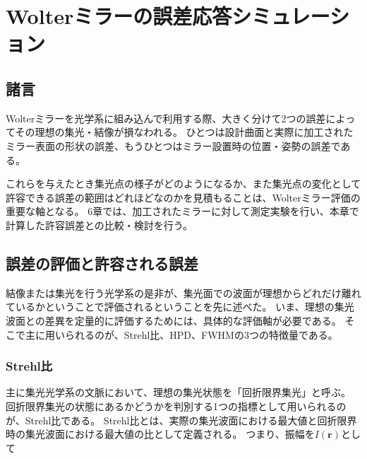 \chapter{Wolterミラーの誤差応答シミュレーション}
\thispagestyle{empty}
\label{chap2}
\graphicspath{{chap2/figure/}}
\minitoc

\newpage


\section{諸言}
\label{chap2_introduction}

Wolterミラーを光学系に組み込んで利用する際、大きく分けて2つの誤差によってその理想の集光・結像が損なわれる。
ひとつは設計曲面と実際に加工されたミラー表面の形状の誤差、もうひとつはミラー設置時の位置・姿勢の誤差である。

これらを与えたとき集光点の様子がどのようになるか、また集光点の変化として許容できる誤差の範囲はどれほどなのかを見積もることは、Wolterミラー評価の重要な軸となる。
6章では、加工されたミラーに対して測定実験を行い、本章で計算した許容誤差との比較・検討を行う。


\clearpage
\newpage
\section{誤差の評価と許容される誤差}
\label{chap2_beam_evaluation_standard}

結像または集光を行う光学系の是非が、集光面での波面が理想からどれだけ離れているかということで評価されるということを先に述べた。
いま、理想の集光波面との差異を定量的に評価するためには、具体的な評価軸が必要である。
そこで主に用いられるのが、Strehl比、HPD、FWHMの3つの特徴量である。

\subsection{Strehl比}
\label{chap2_strehl_ratio}
主に集光光学系の文脈において、理想の集光状態を「回折限界集光」と呼ぶ。
回折限界集光の状態にあるかどうかを判別する1つの指標として用いられるのが、Strehl比である。
Strehl比とは、実際の集光波面における最大値と回折限界時の集光波面における最大値の比として定義される。
つまり、振幅を$I(\mathbf{r})$として

